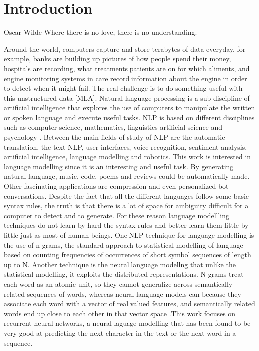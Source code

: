 \chapter{Introduction}
\label{ch:intro}

\begin{chapterquote}{Oscar Wilde}
	Where there is no love, there is no understanding.
\end{chapterquote}
Around the world, computers capture and store terabytes of data everyday. for example, banks are building up pictures of how people spend their money, hospitals are recording, what treatments patients are on for which aliments, and engine monitoring systems in care record information about the engine in order to detect when it might fail. The real challenge is to do something useful with this unstructured data [MLA].  Natural language processing is a sub discipline of artificial intelligence that explores the use of computers to manipulate the written or spoken language and execute useful tasks. NLP is based on different disciplines such as computer science, mathematics, linguistics artificial science and psychology \cite{chowdhury2003natural}.  Between the main fields of study of NLP are the automatic translation, the text NLP, user interfaces, voice recognition, sentiment analysis, artificial intelligence, language modelling and robotics. This work is interested in  language modelling since it is an interesting and useful task. By generating natural language, music, code, poems and reviews could be automatically made. Other fascinating applications are compression and even personalized bot conversations. 
 Despite the fact that all the different languages follow some basic syntax rules, the truth is that there is a lot of space for ambiguity difficult for a computer to detect and to generate.  For these reason language modellling techniques do not learn by hard the syntax rules and better learn them little by little just as most of human beings. One NLP technique for language modelling is the use of n-grams, the standard approach to statistical modelling of language based on counting frequencies of occurrences of short symbol sequences of length up to N. Another technique is the neural language modellng that unlike the statistical modelling, it exploits the  distributed representations. N-grams treat each word as an atomic unit, so they cannot generalize across semantically related sequences of words, whereas neural language models can because they associate each word with a vector of real valued features, and semantically related words end up close to each other in that vector space  \cite{lecun2015deep} .This work focuses on recurrent neural networks, a neural laguage modelling that has been found to be very good at predicting the next character in the text or the next word in a sequence.
